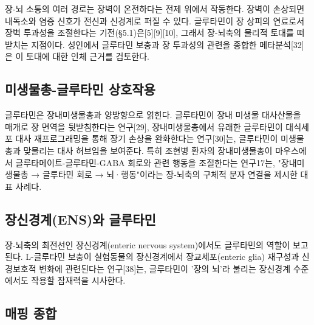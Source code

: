 \documentclass[12pt,oneside]{book}
\begin{document}
장-뇌 소통의 여러 경로는 장벽이 온전하다는 전제 위에서 작동한다. 장벽이 손상되면 내독소와 염증 신호가 전신과 신경계로 퍼질 수 있다. 글루타민이 장 상피의 연료로서 장벽 투과성을 조절한다는 기전(§5.1)은[5][9][10], 그래서 장-뇌축의 물리적 토대를 떠받치는 지점이다. 성인에서 글루타민 보충과 장 투과성의 관련을 종합한 메타분석[32]은 이 토대에 대한 인체 근거를 검토한다.

\subsection{미생물총-글루타민 상호작용}

글루타민은 장내미생물총과 양방향으로 얽힌다. 글루타민이 장내 미생물 대사산물을 매개로 장 면역을 뒷받침한다는 연구[29], 장내미생물총에서 유래한 글루타민이 대식세포 대사 재프로그래밍을 통해 장기 손상을 완화한다는 연구[30]는, 글루타민이 미생물총과 맞물리는 대사 허브임을 보여준다. 특히 조현병 환자의 장내미생물총이 마우스에서 글루타메이트-글루타민-GABA 회로와 관련 행동을 조절한다는 연구17는, "장내미생물총 → 글루타민 회로 → 뇌·행동"이라는 장-뇌축의 구체적 분자 연결을 제시한 대표 사례다.

\subsection{장신경계(ENS)와 글루타민}

장-뇌축의 최전선인 장신경계(enteric nervous system)에서도 글루타민의 역할이 보고된다. L-글루타민 보충이 실험동물의 장신경계에서 장교세포(enteric glia) 재구성과 신경보호적 변화에 관련된다는 연구[38]는, 글루타민이 '장의 뇌'라 불리는 장신경계 수준에서도 작용할 잠재력을 시사한다.

\subsection{매핑 종합}

\vspace{2pt}\vspace{3pt}
\end{document}

